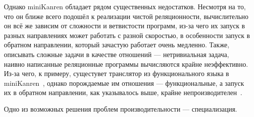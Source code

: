 
Однако miniKanren обладает рядом существенных недостатков. Несмотря на то,
что он ближе всего подошёл к реализации чистой реляционности, вычислительно
он всё же зависим от сложности и ветвистости программ, из-за чего их запуск в
разных направлениях может работать с разной скоростью, в особенности запуск в обратном направлении,
который зачастую работает очень медленно.
Также, описывать сложные задачи в качестве отношений --- нетривиальная задача,
наивно написанные реляционные программы вычисляются крайне неэффективно.
Из-за чего, к примеру, сущестувет транслятор из функционального языка в
miniKanren~\cite{trconv}, однако порождаемые им отношения --- функциональные,
а запуск их в обратном направлении, как указывалось выше, крайне
непроизводителен~\cite{lozov}.

Одно из возможных решения проблем производительности --- специализация.
